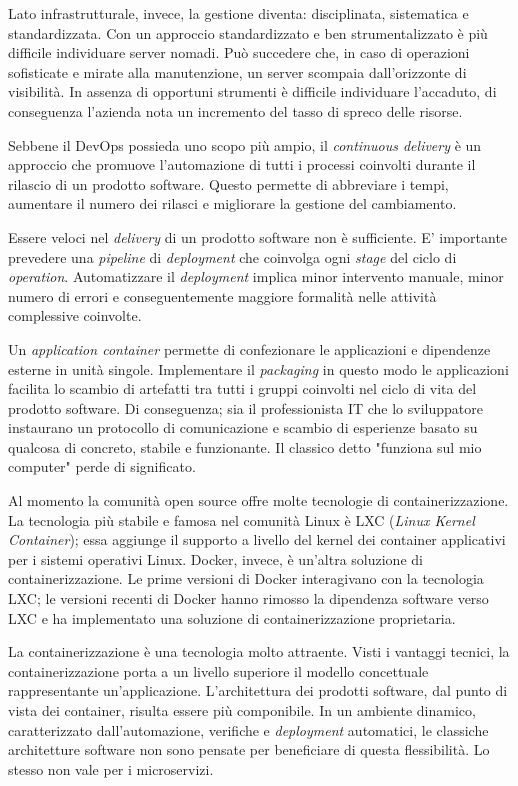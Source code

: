 Lato infrastrutturale, invece, la gestione diventa: disciplinata, sistematica e 
standardizzata. Con un approccio standardizzato e ben strumentalizzato è  
più difficile individuare server nomadi. Può succedere che, in caso di 
operazioni sofisticate e mirate alla manutenzione, un server scompaia 
dall'orizzonte di visibilità. In assenza di opportuni strumenti è difficile 
individuare l'accaduto, di conseguenza l'azienda nota un incremento del tasso 
di spreco delle risorse.   

Sebbene il DevOps possieda uno scopo più ampio, il \textit{continuous delivery} 
è un approccio che promuove l'automazione di tutti i processi coinvolti 
durante il rilascio di un prodotto software. Questo permette di abbreviare i 
tempi, aumentare il numero dei rilasci e migliorare la gestione del cambiamento.

Essere veloci nel \textit{delivery} di un prodotto software non è sufficiente. 
E' importante prevedere una \textit{pipeline} di \textit{deployment} che 
coinvolga ogni \textit{stage} del ciclo di \textit{operation}. Automatizzare il 
\textit{deployment} implica minor intervento manuale, minor numero di errori e 
conseguentemente maggiore formalità nelle attività complessive coinvolte. 

Un \textit{application container} permette di confezionare le applicazioni e 
dipendenze esterne in unità singole. Implementare il \textit{packaging} in 
questo modo le applicazioni facilita lo scambio di artefatti tra tutti i gruppi 
coinvolti nel ciclo di vita del prodotto software. Di conseguenza; sia il 
professionista IT che lo sviluppatore instaurano un protocollo di comunicazione 
e scambio di esperienze basato su qualcosa di concreto, stabile e funzionante.
Il classico detto "funziona sul mio computer" perde di significato.

Al momento la comunità open source offre molte tecnologie di 
containerizzazione. La tecnologia più stabile e famosa nel comunità Linux è LXC 
(\textit{Linux Kernel Container}); essa aggiunge il supporto a 
livello del kernel dei container applicativi per i sistemi operativi Linux. 
Docker, invece, è un'altra soluzione di containerizzazione. Le prime versioni 
di Docker interagivano con la tecnologia LXC; le versioni recenti di Docker hanno rimosso la 
dipendenza software verso LXC e ha implementato una soluzione di 
containerizzazione proprietaria. 

La containerizzazione è una tecnologia molto attraente. Visti i vantaggi 
tecnici, la containerizzazione porta a un livello superiore il modello 
concettuale rappresentante un'applicazione.  L'architettura dei prodotti 
software, dal punto di vista dei container, risulta essere più componibile. In 
un ambiente dinamico, caratterizzato dall'automazione, verifiche e 
\textit{deployment} automatici, le classiche architetture software non sono 
pensate per beneficiare di questa flessibilità. Lo stesso non vale per i  
microservizi. 
 
